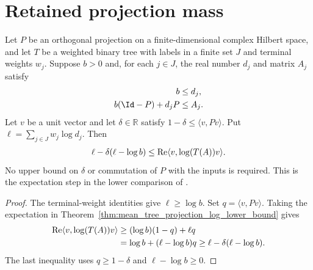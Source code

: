 \section{Retained projection mass}

\begin{theorem}
\label{thm:mean_tree_projection_mass_log_bound}
\leanok
{}
Let $P$ be an orthogonal projection on a finite-dimensional complex
Hilbert space, and let $T$ be a weighted binary tree with labels in a
finite set $J$ and terminal weights $w_j$. Suppose $b>0$ and, for each
$j\in J$, the real number $d_j$ and matrix $A_j$ satisfy
\begin{align}
 b&\le d_j,\notag\\
 b(\Id-P)+d_jP&\le A_j.
 \notag
\end{align}
Let $v$ be a unit vector and let $\delta\in\mathbb R$ satisfy
$1-\delta\le\langle v,Pv\rangle$. Put $\ell=\sum_{j\in J}w_j\log d_j$.
Then
\begin{align}
 \ell-\delta(\ell-\log b)
 \le\operatorname{Re}\langle v,\log(T(A))v\rangle.
 \notag
\end{align}
No upper bound on $\delta$ or commutation of $P$ with the inputs is
required. This is the expectation step in the lower comparison of
\cite[Section~8]{OpenAI2026AreaLaw}.
\end{theorem}

\begin{proof}
\leanok
{}
The terminal-weight identities give $\ell\ge\log b$. Set
$q=\langle v,Pv\rangle$. Taking the expectation in
Theorem~\ref{thm:mean_tree_projection_log_lower_bound} gives
\begin{align}
 \operatorname{Re}\langle v,\log(T(A))v\rangle
 &\ge(\log b)(1-q)+\ell q\notag\\
 &=\log b+(\ell-\log b)q
 \ge\ell-\delta(\ell-\log b).
 \notag
\end{align}
The last inequality uses $q\ge1-\delta$ and $\ell-\log b\ge0$.
\end{proof}
